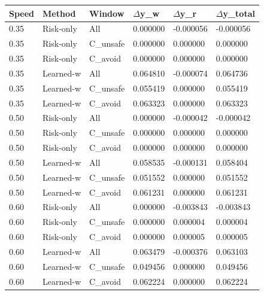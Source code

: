\begin{tabular}{llllll}
\toprule
Speed & Method & Window & $\Delta$y\_w & $\Delta$y\_r & $\Delta$y\_total \\
\midrule
0.35 & Risk-only & All & 0.000000 & -0.000056 & -0.000056 \\
0.35 & Risk-only & C\_unsafe & 0.000000 & 0.000000 & 0.000000 \\
0.35 & Risk-only & C\_avoid & 0.000000 & 0.000000 & 0.000000 \\
0.35 & Learned-w & All & 0.064810 & -0.000074 & 0.064736 \\
0.35 & Learned-w & C\_unsafe & 0.055419 & 0.000000 & 0.055419 \\
0.35 & Learned-w & C\_avoid & 0.063323 & 0.000000 & 0.063323 \\
0.50 & Risk-only & All & 0.000000 & -0.000042 & -0.000042 \\
0.50 & Risk-only & C\_unsafe & 0.000000 & 0.000000 & 0.000000 \\
0.50 & Risk-only & C\_avoid & 0.000000 & 0.000000 & 0.000000 \\
0.50 & Learned-w & All & 0.058535 & -0.000131 & 0.058404 \\
0.50 & Learned-w & C\_unsafe & 0.051552 & 0.000000 & 0.051552 \\
0.50 & Learned-w & C\_avoid & 0.061231 & 0.000000 & 0.061231 \\
0.60 & Risk-only & All & 0.000000 & -0.003843 & -0.003843 \\
0.60 & Risk-only & C\_unsafe & 0.000000 & 0.000004 & 0.000004 \\
0.60 & Risk-only & C\_avoid & 0.000000 & 0.000005 & 0.000005 \\
0.60 & Learned-w & All & 0.063479 & -0.000376 & 0.063103 \\
0.60 & Learned-w & C\_unsafe & 0.049456 & 0.000000 & 0.049456 \\
0.60 & Learned-w & C\_avoid & 0.062224 & 0.000000 & 0.062224 \\
\bottomrule
\end{tabular}
